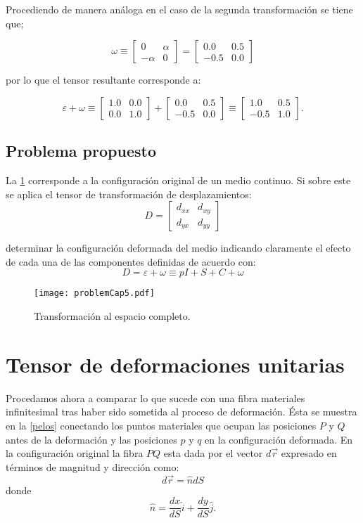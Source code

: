 \documentclass[../notas medios.tex]{subfiles}
\begin{document}
Procediendo de manera análoga en el caso de la segunda transformación se tiene que;

\[\omega  \equiv \left[ {\begin{array}{*{20}{c}}
0&\alpha \\
{ - \alpha }&0
\end{array}} \right] = \left[ {\begin{array}{*{20}{c}}
{0.0}&{0.5}\\
{ - 0.5}&{0.0}
\end{array}} \right]\]

por lo que el tensor resultante corresponde a:

\[\varepsilon  + \omega  \equiv \left[ {\begin{array}{*{20}{c}}
{1.0}&{0.0}\\
{0.0}&{1.0}
\end{array}} \right] + \left[ {\begin{array}{*{20}{c}}
{0.0}&{0.5}\\
{ - 0.5}&{0.0}
\end{array}} \right] \equiv \left[ {\begin{array}{*{20}{c}}
{1.0}&{0.5}\\
{ - 0.5}&{1.0}
\end{array}} \right].\]



\subsection*{Problema propuesto}

La \cref{problem} corresponde a la configuración original de un medio continuo. Si sobre este se aplica el tensor de transformación de desplazamientos:
\[D = \left[ {\begin{array}{*{20}{c}}
{{d_{xx}}}&{{d_{xy}}}\\
{{d_{yx}}}&{{d_{yy}}}
\end{array}} \right]\]


determinar la configuración deformada del medio indicando claramente el efecto de cada una de las componentes definidas de acuerdo con:
\[D = \varepsilon  + \omega  \equiv pI + S + C + \omega \]


\begin{figure}[H]
\centering
	\texttt{[image: problemCap5.pdf]}
	\caption{Transformación al espacio completo.}
	\label{problem}
\end{figure}


\section{Tensor de deformaciones unitarias}
Procedamos ahora a comparar lo que sucede con una fibra materiales infinitesimal tras haber sido sometida al proceso de deformación. Ésta se muestra en la \cref{pelos} conectando los puntos materiales que ocupan las posiciones $P$ y $Q$ antes de la deformación y las posiciones $p$ y $q$ en la configuración deformada. En la configuración original la fibra $PQ$ esta dada por el vector $d\vec{r}$ expresado en términos de magnitud y dirección como:
\[d\vec r = \hat ndS\]
donde
\[\hat n = \frac{{dx}}{{dS}}\hat i + \frac{{dy}}{{dS}}\hat j.\]
\end{document}
